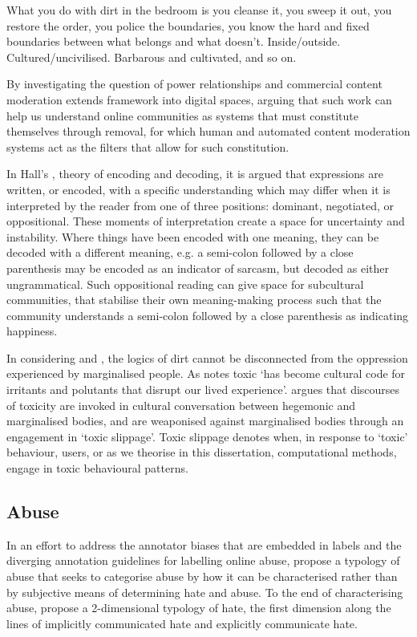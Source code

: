 \begin{aquote}
  What you do with dirt in the bedroom is you cleanse it, you sweep it out, you restore the order, you police the boundaries, you know the hard and fixed boundaries between what belongs and what doesn't. Inside/outside. Cultured/uncivilised. Barbarous and cultivated, and so on. \cite[p. 3]{Hall:1999}
\end{aquote}

By investigating the question of power relationships and commercial content moderation \citet{Lepawsky:2019} extends \citet{Douglas:1966} framework into digital spaces, arguing that such work can help us understand online communities as systems that must constitute themselves through removal, for which human and automated content moderation systems act as the filters that allow for such constitution.

In Hall's \citeyear{Hall:1997}, theory of encoding and decoding, it is argued that expressions are written, or encoded, with a specific understanding which may differ when it is interpreted by the reader from one of three positions: dominant, negotiated, or oppositional. These moments of interpretation create a space for uncertainty and instability. Where things have been encoded with one meaning, they can be decoded with a different meaning, e.g. a semi-colon followed by a close parenthesis may be encoded as an indicator of sarcasm, but decoded as either ungrammatical. Such oppositional reading can give space for subcultural communities, that stabilise their own meaning-making process such that the community understands a semi-colon followed by a close parenthesis as indicating happiness.

In considering \cite{Hall:1997} and \cite{Lepawsky:2019}, the logics of dirt cannot be disconnected from the oppression experienced by marginalised people. As \citet{Rissam:2015} notes toxic `has become cultural code for irritants and polutants that disrupt our lived experience'. \citet{Rissam:2015} argues that discourses of toxicity are invoked in cultural conversation between hegemonic and marginalised bodies, and are weaponised against marginalised bodies through an engagement in `toxic slippage'. Toxic slippage denotes when, in response to `toxic' behaviour, users, or as we theorise in this dissertation, computational methods, engage in toxic behavioural patterns.

\subsection{Abuse}
In an effort to address the annotator biases that are embedded in labels \citep{Waseem:2016} and the diverging annotation guidelines for labelling online abuse, \citet{Waseem:2017} propose a typology of abuse that seeks to categorise abuse by how it can be characterised rather than by subjective means of determining hate and abuse. To the end of characterising abuse, \citet{Waseem:2017} propose a 2-dimensional typology of hate, the first dimension along the lines of implicitly communicated hate and explicitly communicate hate. 

